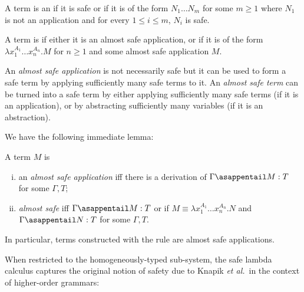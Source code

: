 \begin{definition}
A term is an 
if it is safe or if it is of the form $N_1 \ldots N_m$ for some $m\geq 1$ where $N_1$ is not an application and for every $1 \leq i\leq m$, $N_i$ is safe.

A term is  if either it is an almost safe application, or if it is of the form
$\lambda x_1^{A_1} \ldots x_n^{A_n}. M$ for $n\geq 1$ and some almost safe application $M$.
\end{definition}
An \emph{almost safe application} is not necessarily safe but it can be used to form a safe term by applying sufficiently many safe terms to it. An \emph{almost safe term} can be turned into a safe term by either applying sufficiently many safe terms (if it is an application), or
by abstracting sufficiently many variables (if it is an abstraction).

We have the following immediate lemma:
\begin{lemma}
\label{lem:almostsafeapp_is_appplicative_safe}
A term $M$ is
\begin{enumerate}[(i)]
\item an \emph{almost safe application} iff there is a derivation of $\Gamma \asappentail M : T$ for some $\Gamma, T$;

\item \emph{almost safe} iff $\Gamma \asappentail M : T$ or if $M\equiv \lambda x_1^{A_1} \ldots x_n^{A_n}. N$ and $\Gamma \asappentail N : T$ for some $\Gamma, T$.
\end{enumerate}
\end{lemma}
In particular, terms constructed with the rule  are almost safe applications.
\bigskip

When restricted to the homogeneously-typed sub-system, the safe
lambda calculus captures the original notion of safety due to Knapik
\emph{et al.}~in the context of higher-order grammars:

